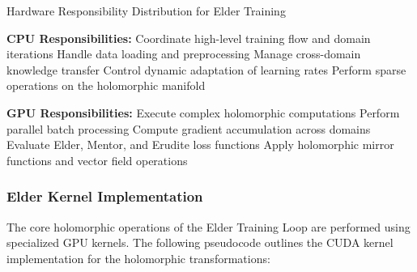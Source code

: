 \begin{algorithm}
\caption{Hardware Responsibility Distribution for Elder Training}
\begin{algorithmic}[1]
\State \textbf{CPU Responsibilities:}
\State \hspace{\algorithmicindent} Coordinate high-level training flow and domain iterations
\State \hspace{\algorithmicindent} Handle data loading and preprocessing
\State \hspace{\algorithmicindent} Manage cross-domain knowledge transfer
\State \hspace{\algorithmicindent} Control dynamic adaptation of learning rates
\State \hspace{\algorithmicindent} Perform sparse operations on the holomorphic manifold

\State \textbf{GPU Responsibilities:}
\State \hspace{\algorithmicindent} Execute complex holomorphic computations
\State \hspace{\algorithmicindent} Perform parallel batch processing
\State \hspace{\algorithmicindent} Compute gradient accumulation across domains
\State \hspace{\algorithmicindent} Evaluate Elder, Mentor, and Erudite loss functions
\State \hspace{\algorithmicindent} Apply holomorphic mirror functions and vector field operations
\end{algorithmic}
\end{algorithm}

\subsubsection{Elder Kernel Implementation}

The core holomorphic operations of the Elder Training Loop are performed using specialized GPU kernels. The following pseudocode outlines the CUDA kernel implementation for the holomorphic transformations:

